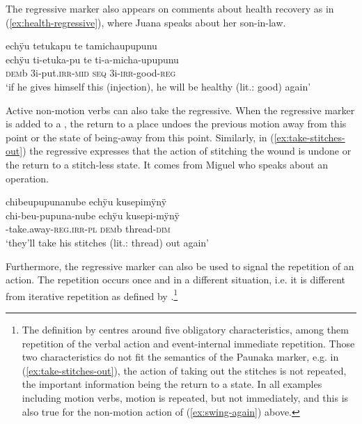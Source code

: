The regressive marker also appears on comments about health recovery as in (\ref{ex:health-regressive}), where Juana speaks about her son-in-law.

\ea\label{ex:health-regressive}
\begingl 
\glpreamble echÿu tetukapu te tamichaupupunu\\
\gla echÿu ti-etuka-pu te ti-a-micha-upupunu\\ 
\glb \textsc{dem}b 3i-put.\textsc{irr}-\textsc{mid} \textsc{seq} 3i-\textsc{irr}-good-\textsc{reg}\\ 
\glft ‘if he gives himself this (injection), he will be healthy (lit.: good) again’\\ 
\endgl
\trailingcitation{[jxx-p110923l-1.068]}
\xe

Active non-motion verbs can also take the regressive. When the regressive marker is added to a , the return to a place undoes the previous motion away from this point or the state of being-away from this point. Similarly, in (\ref{ex:take-stitches-out}) the regressive expresses that the action of stitching the wound is undone or the return to a stitch-less state. It comes from Miguel who speaks about an operation.

\ea\label{ex:take-stitches-out}
\begingl 
\glpreamble chibeupupunanube echÿu kusepimÿnÿ\\
\gla chi-beu-pupuna-nube echÿu kusepi-mÿnÿ\\ 
-take.away-\textsc{reg.irr}-\textsc{pl} \textsc{dem}b thread-\textsc{dim}\\ 
\glft ‘they’ll take his stitches (lit.: thread) out again’\\ 
\endgl
\trailingcitation{[mqx-p110826l.330]}
\xe

Furthermore, the regressive marker can also be used to signal the repetition of an action. The repetition occurs once and in a different situation, i.e. it is different from iterative repetition as defined by \citet[97]{Mueller2013}.\footnote{The definition by \citet[97]{Mueller2013} centres around five obligatory characteristics, among them repetition of the verbal action and event-internal immediate repetition. Those two characteristics do not fit the semantics of the Paunaka marker, e.g. in (\ref{ex:take-stitches-out}), the action of taking out the stitches is not repeated, the important information being the return to a state. In all examples including motion verbs, motion is repeated, but not immediately, and this is also true for the non-motion action of (\ref{ex:swing-again}) above.}

